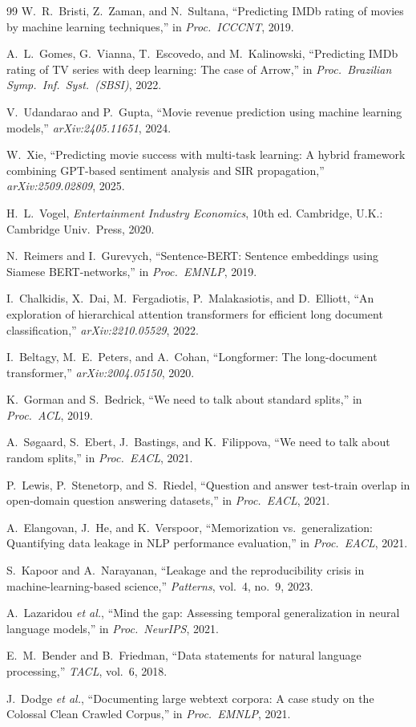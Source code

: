 \documentclass[conference,a4paper]{IEEEtran}
\begin{document}
\begin{thebibliography}{99}
W.~R.~Bristi, Z.~Zaman, and N.~Sultana, ``Predicting IMDb rating of
movies by machine learning techniques,'' in \emph{Proc.\ ICCCNT}, 2019.

A.~L.~Gomes, G.~Vianna, T.~Escovedo, and M.~Kalinowski, ``Predicting
IMDb rating of TV series with deep learning: The case of Arrow,'' in
\emph{Proc.\ Brazilian Symp.\ Inf.\ Syst.\ (SBSI)}, 2022.

V.~Udandarao and P.~Gupta, ``Movie revenue prediction using machine
learning models,'' \emph{arXiv:2405.11651}, 2024.

W.~Xie, ``Predicting movie success with multi-task learning: A hybrid
framework combining GPT-based sentiment analysis and SIR propagation,''
\emph{arXiv:2509.02809}, 2025.

H.~L.~Vogel, \emph{Entertainment Industry Economics}, 10th ed.
Cambridge, U.K.: Cambridge Univ.\ Press, 2020.

N.~Reimers and I.~Gurevych, ``Sentence-BERT: Sentence embeddings using
Siamese BERT-networks,'' in \emph{Proc.\ EMNLP}, 2019.

I.~Chalkidis, X.~Dai, M.~Fergadiotis, P.~Malakasiotis, and D.~Elliott,
``An exploration of hierarchical attention transformers for efficient
long document classification,'' \emph{arXiv:2210.05529}, 2022.

I.~Beltagy, M.~E.~Peters, and A.~Cohan, ``Longformer: The long-document
transformer,'' \emph{arXiv:2004.05150}, 2020.

K.~Gorman and S.~Bedrick, ``We need to talk about standard splits,'' in
\emph{Proc.\ ACL}, 2019.

A.~S{\o}gaard, S.~Ebert, J.~Bastings, and K.~Filippova, ``We need to
talk about random splits,'' in \emph{Proc.\ EACL}, 2021.

P.~Lewis, P.~Stenetorp, and S.~Riedel, ``Question and answer test-train
overlap in open-domain question answering datasets,'' in \emph{Proc.\
EACL}, 2021.

A.~Elangovan, J.~He, and K.~Verspoor, ``Memorization vs.\
generalization: Quantifying data leakage in NLP performance
evaluation,'' in \emph{Proc.\ EACL}, 2021.

S.~Kapoor and A.~Narayanan, ``Leakage and the reproducibility crisis in
machine-learning-based science,'' \emph{Patterns}, vol.~4, no.~9, 2023.

\bibitem{lazaridou2021}
A.~Lazaridou \emph{et al.}, ``Mind the gap: Assessing temporal
generalization in neural language models,'' in \emph{Proc.\ NeurIPS},
2021.

E.~M.~Bender and B.~Friedman, ``Data statements for natural language
processing,'' \emph{TACL}, vol.~6, 2018.

J.~Dodge \emph{et al.}, ``Documenting large webtext corpora: A case
study on the Colossal Clean Crawled Corpus,'' in \emph{Proc.\ EMNLP},
2021.

\end{thebibliography}
\end{document}
